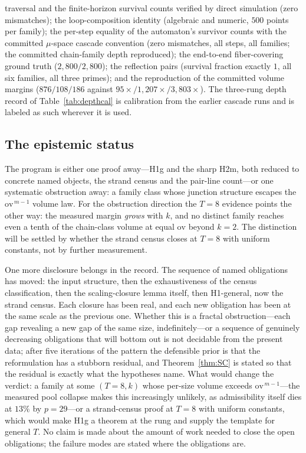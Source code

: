 \documentclass[11pt,a4paper]{article}
\numberwithin{equation}{section}
\theoremstyle{plain}
\theoremstyle{definition}
\theoremstyle{remark}
\begin{document}
traversal and the finite-horizon survival counts verified by direct
simulation (zero mismatches); the loop-composition identity
(algebraic and numeric, $500$ points per family); the per-step
equality of the automaton's survivor counts with the committed
$\mu$-space cascade convention (zero mismatches, all steps, all
families; the committed chain-family depth reproduced); the
end-to-end fiber-covering ground truth ($2{,}800/2{,}800$); the
reflection pairs (survival fraction exactly $1$, all six families,
all three primes); and the reproduction of the committed volume
margins ($876/108/186$ against $95\times/1{,}207\times/3{,}803\times$).
The three-rung depth record of Table~\ref{tab:depthcal} is
calibration from the earlier cascade runs and is labeled as such
wherever it is used.

\subsection{The epistemic status}\label{sec:scale-status}

The program is either one proof away---H1g and the sharp H2m, both
reduced to concrete named objects, the strand census and the pair-line
count---or one systematic obstruction away: a family class whose
junction structure escapes the $\mathrm{ov}^{\,m-1}$ volume law. For
the obstruction direction the $T=8$ evidence points the other way: the
measured margin \emph{grows} with $k$, and no distinct family reaches
even a tenth of the chain-class volume at equal $\mathrm{ov}$ beyond
$k=2$. The distinction will be settled by whether the strand census
closes at $T=8$ with uniform constants, not by further measurement.

One more disclosure belongs in the record. The sequence of named
obligations has moved: the input structure, then the exhaustiveness of
the census classification, then the scaling-closure lemma itself, then
H1-general, now the strand census. Each closure has been real, and
each new obligation has been at the same scale as the previous one.
Whether this is a fractal obstruction---each gap revealing a new gap of
the same size, indefinitely---or a sequence of genuinely decreasing
obligations that will bottom out is not decidable from the present
data; after five iterations of the pattern the defensible prior is that
the reformulation has a stubborn residual, and Theorem~\ref{thm:SC} is
stated so that the residual is exactly what the hypotheses name. What
would change the verdict: a family at some $(T=8,k)$ whose per-size
volume exceeds $\mathrm{ov}^{\,m-1}$---the measured pool collapse
makes this increasingly unlikely, as admissibility itself dies at
$13\%$ by $p=29$---or a strand-census proof at $T=8$ with uniform
constants, which would make H1g a theorem at the rung and supply the
template for general $T$. No claim is made about the amount of work
needed to close the open obligations; the
failure modes are stated where the obligations are.
\end{document}
